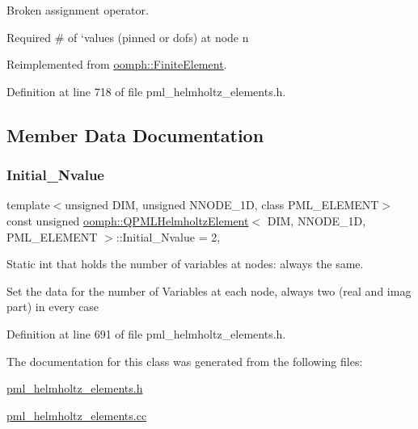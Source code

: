 Broken assignment operator. 

Required \# of `values\textquotesingle{} (pinned or dofs) at node n 

Reimplemented from \hyperlink{classoomph_1_1FiniteElement_a56610c60d5bc2d7c27407a1455471b1a}{oomph\+::\+Finite\+Element}.



Definition at line 718 of file pml\+\_\+helmholtz\+\_\+elements.\+h.



\subsection{Member Data Documentation}
\mbox{\label{classoomph_1_1QPMLHelmholtzElement_a8f24b9dba63db870ee2760913ad8af50}} 
\subsubsection{\texorpdfstring{Initial\+\_\+\+Nvalue}{Initial\_Nvalue}}
{\footnotesize\ttfamily template$<$unsigned D\+IM, unsigned N\+N\+O\+D\+E\+\_\+1D, class P\+M\+L\+\_\+\+E\+L\+E\+M\+E\+NT$>$ \\
const unsigned \hyperlink{classoomph_1_1QPMLHelmholtzElement}{oomph\+::\+Q\+P\+M\+L\+Helmholtz\+Element}$<$ D\+IM, N\+N\+O\+D\+E\+\_\+1D, P\+M\+L\+\_\+\+E\+L\+E\+M\+E\+NT $>$\+::Initial\+\_\+\+Nvalue = 2\hspace{0.3cm}{\ttfamily [static]}, {\ttfamily [private]}}



Static int that holds the number of variables at nodes\+: always the same. 

Set the data for the number of Variables at each node, always two (real and imag part) in every case 

Definition at line 691 of file pml\+\_\+helmholtz\+\_\+elements.\+h.



The documentation for this class was generated from the following files\+:\begin{DoxyCompactItemize}
\item 
\hyperlink{pml__helmholtz__elements_8h}{pml\+\_\+helmholtz\+\_\+elements.\+h}\item 
\hyperlink{pml__helmholtz__elements_8cc}{pml\+\_\+helmholtz\+\_\+elements.\+cc}\end{DoxyCompactItemize}
